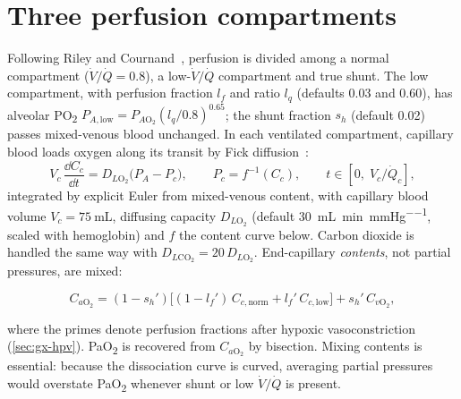 \section{Three perfusion compartments}
\label{sec:gx-vq}
Following Riley and Cournand~\citep{riley1949}, perfusion is divided among a normal compartment ($\dot V/\dot Q = 0.8$), a low-$\dot V/\dot Q$ compartment and true shunt. The low compartment, with perfusion fraction $l_f$ and ratio $l_q$ (defaults 0.03 and 0.60), has alveolar PO\textsubscript{2} $P_{A,\mathrm{low}} = P_{A\mathrm{O_2}}(l_q/0.8)^{0.65}$; the shunt fraction $s_h$ (default 0.02) passes mixed-venous blood unchanged. In each ventilated compartment, capillary blood loads oxygen along its transit by Fick diffusion~\citep{roughton1957}:
\begin{equation}
V_c\,\frac{\dd C_c}{\dd t} = D_{L\mathrm{O_2}}\bigl(P_A - P_c\bigr),\qquad P_c = f^{-1}(C_c),\qquad t \in [0,\;V_c/\dot Q_c],
\label{eq:gx-fick}
\end{equation}
integrated by explicit Euler from mixed-venous content, with capillary blood volume $V_c = \SI{75}{\milli\liter}$, diffusing capacity $D_{L\mathrm{O_2}}$ (default \SI{30}{\milli\liter\per\minute\per\mmHg}, scaled with hemoglobin) and $f$ the content curve below. Carbon dioxide is handled the same way with $D_{L\mathrm{CO_2}} = 20\,D_{L\mathrm{O_2}}$. End-capillary \emph{contents}, not partial pressures, are mixed:
\begin{keyequation}
\begin{equation}
C_{a\mathrm{O_2}} = (1-s_h')\bigl[(1-l_f')\,C_{c,\mathrm{norm}} + l_f'\,C_{c,\mathrm{low}}\bigr] + s_h'\,C_{v\mathrm{O_2}},
\label{eq:gx-mix}
\end{equation}
\end{keyequation}
where the primes denote perfusion fractions after hypoxic vasoconstriction (\cref{sec:gx-hpv}). PaO\textsubscript{2} is recovered from $C_{a\mathrm{O_2}}$ by bisection. Mixing contents is essential: because the dissociation curve is curved, averaging partial pressures would overstate PaO\textsubscript{2} whenever shunt or low $\dot V/\dot Q$ is present.

